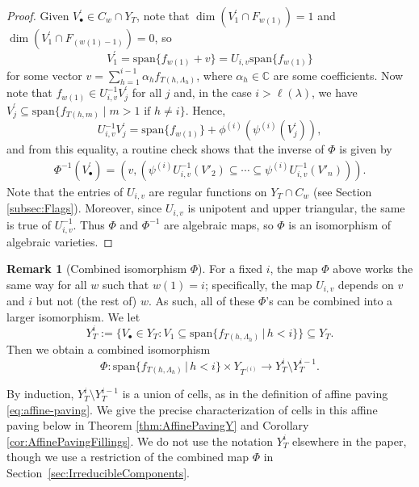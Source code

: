 \documentclass[11pt]{amsart}
\theoremstyle{definition}
\newtheorem{remark}[theorem]{Remark}
\newcommand{\st}{\,|\,}
\newcommand{\vspan}{\mathrm{span}}
\newcommand{\la}{\lambda}
\begin{document}
\begin{proof}
Given $V^\prime_\bullet\in C_w\cap Y_T$, note that $\dim(V^\prime_1\cap F_{w(1)})=1$ and $\dim(V^\prime_1\cap F_{(w(1)-1)})=0$, so 
\begin{equation}
    V^\prime_1 = \vspan\{f_{w(1)} + v\} = U_{i,v} \vspan\{f_{w(1)}\}
\end{equation}
for some vector $v = \sum_{h=1}^{i-1} \alpha_h f_{T(h,\Lambda_h)}$, where $\alpha_h\in\mathbb{C}$ are some coefficients. Now note that $f_{w(1)}\in U^{-1}_{i,v}V^\prime_j$ for all $j$ and, in the case $i>\ell(\la)$, we have $V^\prime_j\subseteq \vspan\{f_{T(h,m)}\mid m>1 \mbox{ if } h\neq i\}$.
Hence,
\begin{equation}
U^{-1}_{i,v}V^\prime_j = \vspan\{f_{w(1)}\} + \phi^{(i)}(\psi^{(i)}(V^\prime_j)),
\end{equation}
and from this equality, a routine check shows that the inverse of $\Phi$ is given by
\begin{align}
    \Phi^{-1}(V^\prime_\bullet) = (v, (\psi^{(i)}U^{-1}_{i,v}(V'_2)\subseteq\cdots\subseteq\psi^{(i)}U^{-1}_{i,v}(V'_n))).
\end{align}
Note that the entries of $U_{i,v}$ are regular functions on $Y_T \cap C_w$ (see Section \ref{subsec:Flags}). Moreover, since $U_{i,v}$ is unipotent and upper triangular, the same is true of $U_{i,v}^{-1}$. Thus $\Phi$ and $\Phi^{-1}$ are algebraic maps, so $\Phi$ is an isomorphism of algebraic varieties.
\end{proof}

\begin{remark}[Combined isomorphism $\Phi$]\label{rmk:CombinedIso}
For a fixed $i$, the map $\Phi$ above works the same way for all $w$ such that $w(1) = i$; specifically, the map $U_{i,v}$ depends on $v$ and $i$ but not (the rest of) $w$. As such, all of these $\Phi$'s can be combined into a larger isomorphism. We let
\begin{equation}
    Y_T^i := \big\{V_\bullet \in Y_T : V_1 \subseteq \vspan\{f_{T(h,\Lambda_h)}\st h <i\}\big\} \subseteq Y_T.
\end{equation}
Then we obtain a combined isomorphism
\begin{equation}
    \Phi : \vspan\{f_{T(h,\Lambda_h)}\st h <i\} \times Y_{T^{(i)}} \to Y_T^i \setminus Y_T^{i-1}.
\end{equation}

By induction, $Y_T^i \setminus Y_T^{i-1}$ is a union of cells, as in the definition of affine paving \eqref{eq:affine-paving}. We give the precise characterization of cells in this affine paving below in Theorem \ref{thm:AffinePavingY} and Corollary \ref{cor:AffinePavingFillings}.
We do not use the notation $Y_T^i$ elsewhere in the paper, though we use a restriction of the combined map $\Phi$ in Section~\ref{sec:IrreducibleComponents}. 
\end{remark}
\end{document}

